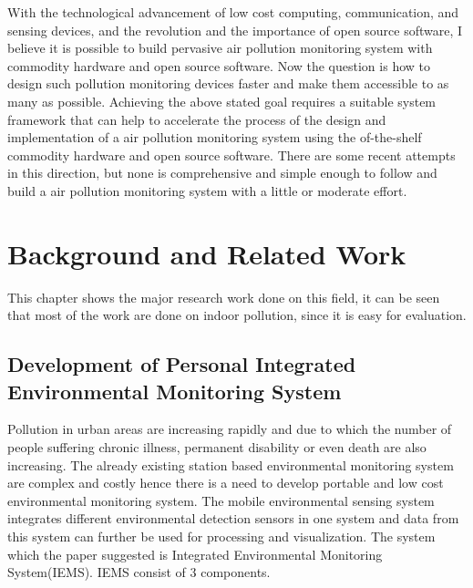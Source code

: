 \documentclass[10pt,a4paper]{report}
\begin{document}
  With the technological advancement of low cost computing, communication, and sensing devices, and the revolution and the importance of open source software\cite{A16}, I believe it is possible to build pervasive air pollution monitoring system with commodity hardware and open source software. Now the question is how to design such pollution monitoring devices faster and make them accessible to as many as possible.
Achieving the above stated goal requires a suitable system framework that can help to accelerate the process of the design and implementation of a air pollution monitoring system using the of-the-shelf commodity hardware and open source software. There are some recent attempts in this direction, but none is comprehensive and simple enough to follow and build a air pollution monitoring system with a little or moderate effort. 


\chapter{ Background and Related Work}
This chapter shows the major research work done on this field, it can be seen that most of the work are done on indoor pollution, since it is easy for evaluation.
\section{Development of Personal Integrated Environmental Monitoring System}

Pollution in urban areas are increasing rapidly and due to which the number of people suffering chronic illness, permanent disability or even death are also increasing. The already existing station based environmental monitoring system are complex and costly hence there is a need to develop portable and low cost environmental monitoring system. The mobile environmental sensing system integrates different environmental detection sensors in one system and data from this system can further be used for processing and visualization. The system which the paper suggested is Integrated Environmental Monitoring System(IEMS). IEMS consist of 3 components.
\end{document}

